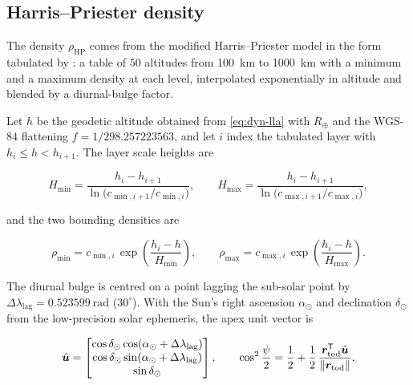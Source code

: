 \subsection{Harris--Priester density}

The density $\rho_\mathrm{HP}$ comes from the modified Harris--Priester model
\citep{harris1962priester} in the form tabulated by \citet{montenbruck2000}: a
table of $50$ altitudes from \SI{100}{\kilo\meter} to \SI{1000}{\kilo\meter} with
a minimum and a maximum density at each level, interpolated exponentially in
altitude and blended by a diurnal-bulge factor.

Let $h$ be the geodetic altitude obtained from \cref{eq:dyn-lla} with
$R_\oplus$ and the WGS-84 flattening $f=1/298.257223563$, and let $i$ index the
tabulated layer with $h_i \le h < h_{i+1}$. The layer scale heights are

\begin{equation}
  \label{eq:dyn-hp-scale}
  H_{\min} = \frac{h_i - h_{i+1}}{\ln\!\bigl(c_{\min,i+1}/c_{\min,i}\bigr)},
  \qquad
  H_{\max} = \frac{h_i - h_{i+1}}{\ln\!\bigl(c_{\max,i+1}/c_{\max,i}\bigr)},
\end{equation}

and the two bounding densities are

\begin{equation}
  \label{eq:dyn-hp-bounds}
  \rho_{\min} = c_{\min,i}\,\exp\!\left(\frac{h_i-h}{H_{\min}}\right),
  \qquad
  \rho_{\max} = c_{\max,i}\,\exp\!\left(\frac{h_i-h}{H_{\max}}\right).
\end{equation}

The diurnal bulge is centred on a point lagging the sub-solar point by
$\Delta\lambda_\mathrm{lag} = \SI{0.523599}{\radian}$ ($30^\circ$). With the Sun's
right ascension $\alpha_\odot$ and declination $\delta_\odot$ from the
low-precision solar ephemeris, the apex unit vector is

\begin{equation}
  \label{eq:dyn-hp-apex}
  \hat{\bm{u}} =
  \begin{bmatrix}
    \cos\delta_\odot\cos(\alpha_\odot + \Delta\lambda_\mathrm{lag}) \\
    \cos\delta_\odot\sin(\alpha_\odot + \Delta\lambda_\mathrm{lag}) \\
    \sin\delta_\odot
  \end{bmatrix},
  \qquad
  \cos^{2}\frac{\psi}{2} = \frac{1}{2} + \frac{1}{2}\,
  \frac{\bm{r}_\mathrm{tod}^{\mathsf{T}}\hat{\bm{u}}}{\lVert\bm{r}_\mathrm{tod}\rVert},
\end{equation}

